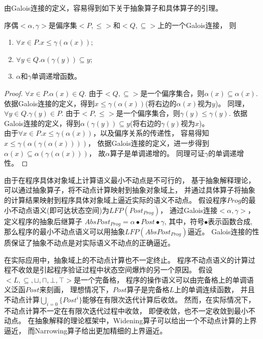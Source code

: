由Galois连接的定义，容易得到如下关于抽象算子和具体算子的引理。

\begin{lemma}
序偶$<\alpha, \gamma>$是偏序集$<P, \leq>$和$<Q, \subseteq>$上的一个Galois连接， 则
\begin{enumerate}
\item $\forall x\in P. x \leq \gamma(\alpha(x))$;
\item $\forall y\in Q. \alpha(\gamma(y)) \subseteq y$;
\item $\alpha$和$\gamma$单调递增函数。
\end{enumerate}
\end{lemma}
	
\begin{proof}
$\forall x\in P. \alpha(x) \in Q$. 
由于$<Q, \subseteq>$是一个偏序集合，则$\alpha(x) \subseteq \alpha(x)$.
依据Galois连接的定义，得到$ x \leq \gamma(\alpha(x))$(将右边的$\alpha(x)$视为$y$)。
同理，$\forall y \in Q. \gamma(y) \in P$.
由于$<P, \leq>$是一个偏序集合，则$\gamma(y) \leq \gamma(y)$.
依据Galois连接的定义，得到$\alpha(\gamma(y)) \subseteq y$(将右边的$\gamma(y)$视为$x$)。\\
由于$\forall x\in P. x\leq \gamma(\alpha(x))$，以及偏序关系的传递性，
容易得知$ x\leq \gamma(\alpha(\gamma(\alpha(x))))$，
依据Galois连接的定义，进一步得到$\alpha(x)\subseteq \alpha(\gamma(\alpha(x)))$，
故$\alpha$算子是单调递增的。
同理可证$\gamma$的单调递增性。
\end{proof}


由于在程序具体对象域上计算语义最小不动点是不可行的，
基于抽象解释理论，可以通过抽象算子，将不动点计算映射到抽象对象域上，
并通过具体算子将抽象的计算结果映射到程序具体对象域上逼近实际的语义不动点。
假设程序$Prog$的最小不动点语义(即可达状态空间)为$LFP(Post_{Prog})$，
通过Galois连接$<\alpha, \gamma>$，定义程序的抽象后继算子
$AbsPost_{Prog} = \alpha \bullet Post \bullet \gamma$,
其中，符号$\bullet$表示函数合成,
那么程序的最小不动点语义可以用抽象$LFP(AbsPost_{Prog})$逼近。
Galois连接的性质保证了抽象不动点是对实际语义不动点的正确逼近。

在实际应用中，抽象域上的不动点计算也不一定终止。
程序不动点语义的计算过程不收敛是引起程序验证过程中状态空间爆炸的另一个原因。
假设$<L,\subseteq, \sqcup, \sqcap, \bot,\top>$是一个完备格，
程序的操作语义可以由完备格上的单调语义泛函$Post$来刻画，
理想情况下，$Post$算子是完备格$L$上的单调连续函数，
并且不动点计算$\bigcup_{i=0}\{Post^{i}\}$能够在有限次迭代计算后收敛。
然而，在实际情况下，不动点计算不一定在有限次迭代过程中收敛，
即便收敛，也不一定收敛到最小不动点。
在抽象解释的理论框架中，Widening算子可以给出一个不动点计算的上界逼近，
而Narrowing算子给出更加精细的上界逼近。

